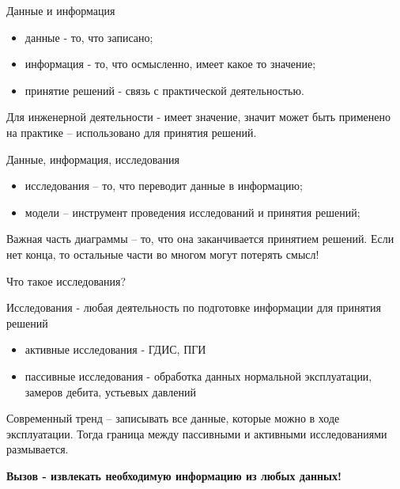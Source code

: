 \begin{frame}{Данные и информация}

\begin{center}
    
\end{center}

\begin{itemize}
    \item данные - то, что записано;
    \item информация - то, что осмысленно, имеет какое то значение;
    \item принятие решений - связь с практической деятельностью.
\end{itemize}

Для инженерной деятельности - имеет значение, значит может быть применено на практике -- использовано для принятия решений.

\end{frame}

\begin{frame}{Данные, информация, исследования}

\begin{center}
    
\end{center}

\begin{itemize}
    \item исследования -- то, что переводит данные в информацию;
    \item модели -- инструмент проведения исследований и принятия решений;
\end{itemize}

Важная часть диаграммы -- то, что она заканчивается принятием решений. Если нет конца, то остальные части во многом могут потерять смысл!

\end{frame}

\begin{frame}{Что такое исследования?}

Исследования - любая деятельность по подготовке информации для принятия решений
\begin{itemize}
    \item активные исследования - ГДИС, ПГИ
    \item пассивные исследования - обработка данных нормальной эксплуатации, замеров дебита, устьевых давлений
\end{itemize}

Современный тренд -- записывать все данные, которые можно в ходе эксплуатации. Тогда граница между пассивными и активными исследованиями размывается.

\textbf{Вызов - извлекать необходимую информацию из любых данных!}
\end{frame}

